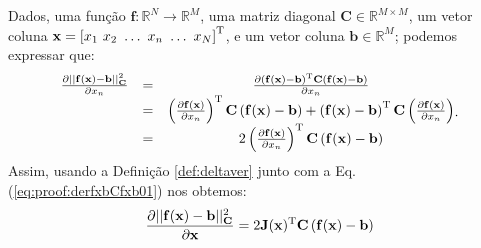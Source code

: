 \begin{myproofT}\label{proof:theo:derfxbCfxb0}
Dados,
uma função $\mathbf{f}:\mathbb{R}^{N} \rightarrow \mathbb{R}^{M}$, 
uma matriz diagonal $\mathbf{C}\in \mathbb{R}^{M\times M}$, 
um vetor coluna $\mathbf{x}=\left[x_{1}~ x_{2}~ \hdots~ x_{n}~ \hdots~ x_{N}\right]^{\mathrm{T}}$, e
um vetor coluna $\mathbf{b}\in \mathbb{R}^{M}$;
podemos expressar que:
\begin{equation}\label{eq:proof:derfxbCfxb01}
\begin{matrix}
\frac{\partial ||\mathbf{f}(\mathbf{x})-\mathbf{b}||_{\mathbf{C}}^2}{\partial x_{n}} & = &
\frac{\partial \left( \mathbf{f}(\mathbf{x})-\mathbf{b}\right)^{\mathrm{T}} \mathbf{C} \left( \mathbf{f}(\mathbf{x})-\mathbf{b}\right) }{\partial x_{n}} \\
~ &= &
 \left(  \frac{\partial\mathbf{f}(\mathbf{x})  }{\partial x_{n}} \right)^{\mathrm{T}} \mathbf{C} \left( \mathbf{f}(\mathbf{x})-\mathbf{b}\right) +
 \left( \mathbf{f}(\mathbf{x})-\mathbf{b}\right)^{\mathrm{T}} \mathbf{C}  \left(  \frac{\partial\mathbf{f}(\mathbf{x})  }{\partial x_{n}} \right)\\
~ &= &
 2 \left(  \frac{\partial\mathbf{f}(\mathbf{x})  }{\partial x_{n}} \right)^{\mathrm{T}} \mathbf{C} \left( \mathbf{f}(\mathbf{x})-\mathbf{b}\right)
\end{matrix}.
\end{equation}
Assim, usando a Definição \ref{def:deltaver} junto com a Eq. (\ref{eq:proof:derfxbCfxb01})
nos obtemos:
\begin{equation}\label{eq:proof:derfxbCfxb02}
\frac{\partial ||\mathbf{f}(\mathbf{x})-\mathbf{b}||_{\mathbf{C}}^2}{\partial \mathbf{x}}  = 
2 \mathbf{J}(\mathbf{x})^{\mathrm{T}} \mathbf{C} \left( \mathbf{f}(\mathbf{x})-\mathbf{b}\right)
\end{equation}
\end{myproofT}


